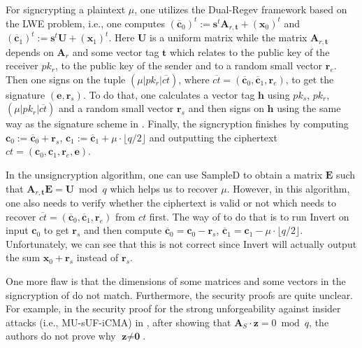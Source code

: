 \documentclass[a4paper,11pt,onecolumn]{elsarticle}
\begin{document}
	
	For signcrypting a plaintext  $\mu$, one  utilizes the Dual-Regev framework based on the LWE problem, i.e., one computes $(\overline{\textbf{c}}_0)^t:=\textbf{s}^t\textbf{A}_{r,\textbf{t}}+(\textbf{x}_0)^t$ and $(\overline{\textbf{c}}_1)^t:=\textbf{s}^t\textbf{U}+(\textbf{x}_1)^t$. Here $\textbf{U}$ is a uniform matrix while the matrix $\textbf{A}_{r,\textbf{t}}$  depends  on $\textbf{A}_{r}$ and some vector tag $\textbf{t}$ which relates to the public key of the receiver $pk_r$, to the public key of the sender and to a random small vector $\textbf{r}_e$. Then one signs on the tuple $(\mu|pk_r|\overline{ct})$, where $\overline{ct}=(\overline{\textbf{c}}_0, \overline{\textbf{c}}_1, \textbf{r}_e)$, to get the signature $(\textbf{e}, \textbf{r}_s)$. To do that, one calculates a vector tag $\textbf{h}$ using $pk_s$, $pk_r$, $(\mu|pk_r|\overline{ct})$ and a random small vector $\textbf{r}_s$ and then signs on $\textbf{h}$ using the same way as the signature scheme in \cite[Section 6.2]{MP12}. Finally, the signcryption finishes by computing  $\textbf{c}_0:=\overline{\textbf{c}}_0+\textbf{r}_s$,  $\textbf{c}_1:=\overline{\textbf{c}}_1+\mu\cdot \lfloor q/2 \rfloor$ and outputting the ciphertext $ct=(\textbf{c}_0, \textbf{c}_1, \textbf{r}_e, \textbf{e})$.  
	
	In the unsigncryption algorithm, one can use \textsf{SampleD} to obtain a matrix $\textbf{E}$ such that $\textbf{A}_{r,\textbf{t}}\textbf{E}=\textbf{U} \bmod q$ which helps us to recover $\mu$. However, in this algorithm, one also needs to verify whether the ciphertext is valid or not which needs to recover $\overline{ct}=(\overline{\textbf{c}}_0, \overline{\textbf{c}}_1, \textbf{r}_e)$ from $ct$ first. The way of \cite{SS18} to do that is to run \textsf{Invert} on input $\textbf{c}_0$ to get $\textbf{r}_s$  and then compute $\overline{\textbf{c}}_0=\textbf{c}_0-\textbf{r}_s$, $\overline{\textbf{c}}_1=\textbf{c}_1-\mu \cdot \lfloor q/2 \rfloor $. Unfortunately, we can see that this is not correct since \textsf{Invert} will actually output the sum $\textbf{x}_0+\textbf{r}_s$ instead  of $\textbf{r}_s$. 
	
	One more flaw is that the dimensions of some matrices and some vectors in  the signcryption of \cite{SS18} do not match. Furthermore, the security proofs are quite unclear. For example, in the security proof for the strong unforgeability against insider attacks (i.e., MU-sUF-iCMA) in \cite[Theorem 2]{SS18}, after showing that $\textbf{A}_S \cdot \textbf{z}=0 \bmod q$, the authors do not prove why $\textbf{z}\neq \textbf{0}$.	\\
		
\end{document}
